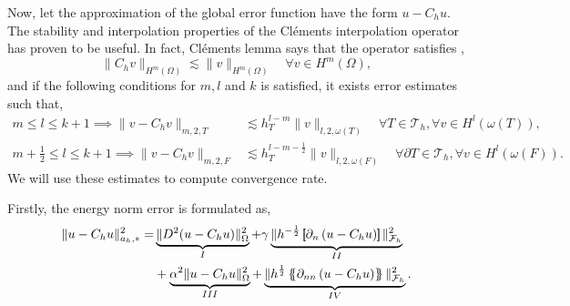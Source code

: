 Now, let the approximation of the global error function have the form $u - C_{h}u$.
The stability and interpolation properties of the Cléments interpolation operator has proven to be useful. In fact, Cléments lemma says that the operator satisfies \cite{ern04},
\[
 \| C_{h} v \|_{H^{m}\left( \Omega  \right)   }^{  } \lesssim \| v \|_{ H^{m}\left( \Omega  \right)  }^{  } \quad \forall v \in H^{m}\left( \Omega  \right),
\]
and if the following conditions for $m,l$ and $k$ is satisfied, it exists error estimates such that,
\[
    \begin{split}
      m\le l \le k+1  \implies \| v - C_{h} v \|_{ m,2,T   }^{  }  &  \lesssim h^{l-m}_{T} \| v \|_{l,2,\omega \left( T \right)  }^{  } \quad  \forall T \in \mathcal{T} _{h}, \forall v \in H^{l}\left( \omega \left( T \right)
      \right), \\
      m +\frac{1}{2}\le l \le k+1  \implies \| v - C_{h} v \|_{ m,2,F }^{  } & \lesssim h^{l-m- \frac{1}{2}}_{T} \| v \|_{l,2,\omega \left( F \right)  }^{  } \quad  \forall \partial T \in \mathcal{T} _{h}, \forall v \in H^{l}\left( \omega \left( F
      \right)  \right).
    \end{split}
\]
We will use these estimates to compute convergence rate.

Firstly, the energy norm error is formulated as, \[
    \begin{split}
\| u - C_{h}u \|_{ a_{h},* }^{ 2 }  =&  \underbrace{\| D^2( u - C_{h}u ) \|_{\Omega   }^{2  }}_{I}  + \gamma \underbrace{\| h^{-\frac{1}{2}} \jump{ \partial _{n}\left( u - C_{h}u \right)  }    \|_{ \mathcal{F} _{h}  }^{2  }}_{II} \\
& +  \underbrace{\alpha ^2 \| u - C_{h}u \|_{\Omega   }^{2}}_{III}  + \underbrace{\| h^{\frac{1}{2}} \mean{ \partial _{nn}\left(  u - C_{h}u\right)  }   \|_{\mathcal{F} _{h}  }^{ 2 }}_{IV}.
    \end{split}
\]


